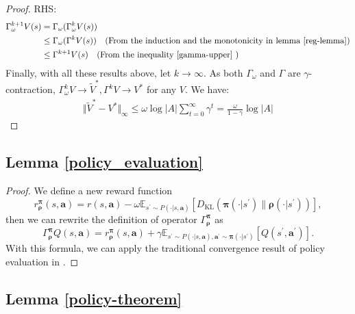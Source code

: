 \documentclass{article}
\begin{document}
\begin{proof}
	RHS:
	\begin{align*}
	    \Gamma_\omega^{k + 1} V(s) & = \Gamma_\omega (\Gamma_\omega^{k} V(s)) \\
	    & \le \Gamma_\omega(\Gamma^{k} V(s)) \quad (\text{From the induction and the monotonicity in lemma \ref{reg-lemma}} ) \\
	    & \le \Gamma^{k + 1} V(s) \quad (\text{From the inequality \ref{gamma-upper} } )
  	\end{align*}
	 Finally, with all these results above, let $k \to \infty$. As both $\Gamma_\omega$ and $\Gamma$ are $\gamma$-contraction, $\Gamma_\omega^k V \to \tilde{V}^*, \Gamma^k V \to V^*$ for any $V$. We have:
	 \begin{align*}
	     \Vert \tilde{V}^* - V^* \Vert_{\infty}  \le \omega \log |A| \sum_{t=0}^{\infty} \gamma^t 
	      = \frac{\omega}{1-\gamma} \log |A|
	 \end{align*}
	\end{proof}
	
	   
	\subsection{Lemma \ref{policy_evaluation}}
	\label{sec:app-eva}
	
	\begin{proof}
		We define a new reward function 
		\begin{equation*}
			r_{\bm{\rho}}^{\bm{\pi}}(s,\bm{a}) = r(s,\bm{a}) - \omega \mathbb{E}_{s^{\prime} \sim P(\cdot |s,\bm{a} )} \left[D_{\operatorname{KL}}\left( {\bm{\pi}}(\cdot|s^{\prime}) \| {\bm{\rho}}(\cdot|s^{\prime}) \right) \right], 
		\end{equation*}
		then we can rewrite the definition of operator $\Gamma^{\operatorname{\bm{\pi}}}_{\operatorname{\bm{\rho}}}$ as 
		\begin{equation*}
			\Gamma^{\operatorname{\bm{\pi}}}_{\operatorname{\bm{\rho}}} Q(s,\bm{a})  = r_{\bm{\rho}}^{\bm{\pi}}(s,\bm{a}) + \gamma \mathbb{E}_{s^{\prime} \sim P(\cdot | s, \bm{a}), \bm{a^{\prime}} \sim  \bm{\pi}(\cdot | s^{\prime}) } \left[ Q(s^{\prime},\bm{a^{\prime}}) \right]. 
		\end{equation*}
		With this formula, we can apply the traditional convergence result of policy evaluation in \citet{RLBOOK}.
	\end{proof}
	
	\subsection{Lemma \ref{policy-theorem}}
	\label{sec:app-improv}
	
\end{document}
